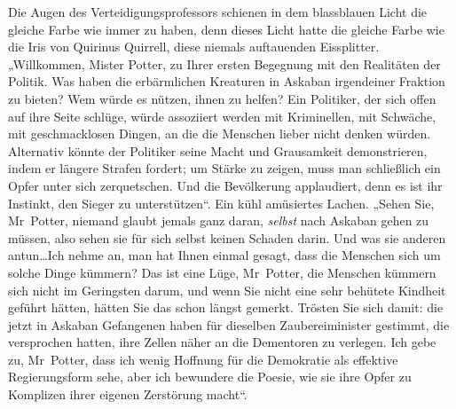 Die Augen des Verteidigungsprofessors schienen in dem blassblauen Licht die gleiche Farbe wie immer zu haben, denn dieses Licht hatte die gleiche Farbe wie die Iris von Quirinus Quirrell, diese niemals auftauenden Eissplitter. „Willkommen, Mister Potter, zu Ihrer ersten Begegnung mit den Realitäten der Politik. Was haben die erbärmlichen Kreaturen in Askaban irgendeiner Fraktion zu bieten? Wem würde es nützen, ihnen zu helfen? Ein Politiker, der sich offen auf ihre Seite schlüge, würde assoziiert werden mit Kriminellen, mit Schwäche, mit geschmacklosen Dingen, an die die Menschen lieber nicht denken würden. Alternativ könnte der Politiker seine Macht und Grausamkeit demonstrieren, indem er längere Strafen fordert; um Stärke zu zeigen, muss man schließlich ein Opfer unter sich zerquetschen. Und die Bevölkerung applaudiert, denn es ist ihr Instinkt, den Sieger zu unterstützen“. Ein kühl amüsiertes Lachen. „Sehen Sie, Mr~Potter, niemand glaubt jemals ganz daran, \emph{selbst} nach Askaban gehen zu müssen, also sehen sie für sich selbst keinen Schaden darin. Und was sie anderen antun…Ich nehme an, man hat Ihnen einmal gesagt, dass die Menschen sich um solche Dinge kümmern? Das ist eine Lüge, Mr~Potter, die Menschen kümmern sich nicht im Geringsten darum, und wenn Sie nicht eine sehr behütete Kindheit geführt hätten, hätten Sie das schon längst gemerkt. Trösten Sie sich damit: die jetzt in Askaban Gefangenen haben für dieselben Zaubereiminister gestimmt, die versprochen hatten, ihre Zellen näher an die Dementoren zu verlegen. Ich gebe zu, Mr~Potter, dass ich wenig Hoffnung für die Demokratie als effektive Regierungsform sehe, aber ich bewundere die Poesie, wie sie ihre Opfer zu Komplizen ihrer eigenen Zerstörung macht“.

